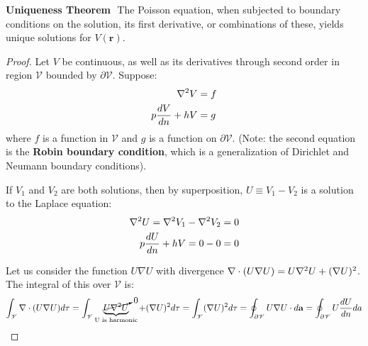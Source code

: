 \documentclass{article}
\begin{document}
\begin{theorem}{\textbf{Uniqueness Theorem}}
    $ $ \newline
    The Poisson equation, when subjected to boundary conditions on the solution, its first derivative, or combinations of these, yields unique solutions for \(V(\mathbf{r})\). 
\end{theorem}
\begin{proof}
    Let \(V\) be continuous, as well as its derivatives through second order in region \(\mathscr{V}\) bounded by \(\partial \mathscr{V}\). Suppose:
    \begin{align*}
        \laplacian{V}&=f \\
        p\frac{dV}{dn}+hV&=g
    \end{align*}
    where \(f\) is a function in \(\mathscr{V}\) and \(g\) is a function on \(\partial \mathscr{V}\). (Note: the second equation is the \textbf{Robin boundary condition}, which is a generalization of 
    Dirichlet and Neumann boundary conditions).
    
    If \(V_1\) and \(V_2\) are both solutions, then by superposition, \(U\equiv V_1-V_2\) is a solution to the Laplace equation:
    \begin{align*}
        \laplacian{U}=\laplacian{V_1}-\laplacian{V_2}&=0 \\
        p\frac{dU}{dn}+hV=0-0&=0
    \end{align*}

    Let us consider the function \(U\nabla U\) with divergence \(\nabla \cdot (U\nabla U)=U \laplacian{U}+(\nabla U)^2\). The integral of this over \(\mathscr{V}\) is:
    \[
        \int_{\mathscr{V}} \nabla \cdot (U\nabla U)d \tau =\int_{\mathscr{V}}\underbrace{\cancelto{0}{U\laplacian{U}}}_{\text{U is harmonic}}+(\nabla U)^2 d \tau =\int_{\mathscr{V}}(\nabla U)^2 d \tau =\oint_{\partial \mathscr{V}} U \nabla U \cdot d \mathbf{a} =\oint_{\partial \mathscr{V}} U\frac{dU}{dn}da
    \]


\end{proof}
\end{document}
